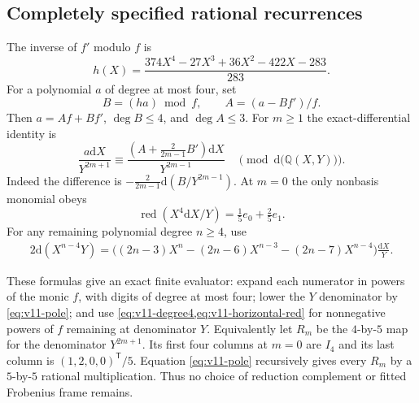 \documentclass[11pt]{article}
\theoremstyle{definition}
\theoremstyle{remark}
\newcommand{\Q}{\mathbb Q}
\newcommand{\dd}{\mathrm d}
\begin{document}
\subsection{Completely specified rational recurrences}
The inverse of $f'$ modulo $f$ is
\begin{equation}
 \boxed{h(X)=
 \frac{374X^4-27X^3+36X^2-422X-283}{283}.}
 \label{eq:v11-bezout}
\end{equation}
For a polynomial $a$ of degree at most four, set
\[
 B=(ha)\bmod f,\qquad A=(a-Bf')/f.
\]
Then $a=Af+Bf'$, $\deg B\le4$, and $\deg A\le3$.
For $m\ge1$ the exact-differential identity is
\begin{equation}
 \frac{a\dd X}{Y^{2m+1}}
 \equiv
 \frac{(A+\frac2{2m-1}B')\dd X}{Y^{2m-1}}
 \quad\pmod{\dd\bigl(\Q(X,Y)\bigr)}.
 \label{eq:v11-pole}
\end{equation}
Indeed the difference is
$-\frac2{2m-1}\dd(B/Y^{2m-1})$.
At $m=0$ the only nonbasis monomial obeys
\begin{equation}
 \operatorname{red}(X^4\dd X/Y)
 =\tfrac15 e_0+\tfrac25 e_1.
 \label{eq:v11-degree4}
\end{equation}
For any remaining polynomial degree $n\ge4$, use
\begin{equation}
 \begin{split}
 2\dd(X^{n-4}Y)=
 \bigl((2n-3)X^n-(2n-6)X^{n-3}-(2n-7)X^{n-4}\bigr)
 \frac{\dd X}{Y}.
 \end{split}
 \label{eq:v11-horizontal-red}
\end{equation}

These formulas give an exact finite evaluator: expand each numerator in
powers of the monic $f$, with digits of degree at most four; lower the
$Y$ denominator by \cref{eq:v11-pole}; and use
\cref{eq:v11-degree4,eq:v11-horizontal-red} for nonnegative powers of
$f$ remaining at denominator $Y$. Equivalently let $R_m$ be the $4$-by-$5$
map for the denominator $Y^{2m+1}$. Its first four columns at $m=0$
are $I_4$ and its last column is $(1,2,0,0)^{\mathsf T}/5$.
Equation \cref{eq:v11-pole} recursively gives every $R_m$ by a
$5$-by-$5$ rational multiplication. Thus no choice of reduction
complement or fitted Frobenius frame remains.
\end{document}
